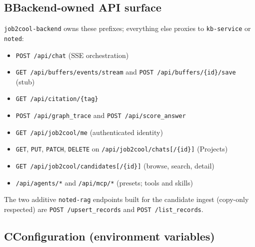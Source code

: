 \subsection*{B\quad Backend-owned API surface}

\verb|job2cool-backend| owns these prefixes; everything else proxies to
\verb|kb-service| or \verb|noted|:

\begin{itemize}
  \item \verb|POST /api/chat| (SSE orchestration)
  \item \verb|GET /api/buffers/events/stream| and \verb|POST /api/buffers/{id}/save| (stub)
  \item \verb|GET /api/citation/{tag}|
  \item \verb|POST /api/graph_trace| and \verb|POST /api/score_answer|
  \item \verb|GET /api/job2cool/me| (authenticated identity)
  \item \verb|GET|, \verb|PUT|, \verb|PATCH|, \verb|DELETE| on \verb|/api/job2cool/chats[/{id}]| (Projects)
  \item \verb|GET /api/job2cool/candidates[/{id}]| (browse, search, detail)
  \item \verb|/api/agents/*| and \verb|/api/mcp/*| (presets; tools and skills)
\end{itemize}

The two additive \verb|noted-rag| endpoints built for the candidate ingest (copy-only
respected) are \verb|POST /upsert_records| and \verb|POST /list_records|.

\subsection*{C\quad Configuration (environment variables)}

